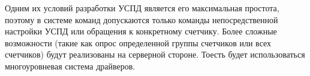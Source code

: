Одним их условий разработки УСПД является его максимальная простота, поэтому в системе команд допускаются только команды непосредственной настройки УСПД или обращения к конкретному счетчику. Более сложные возможности (такие как опрос определенной группы счетчиков или всех счетчиков) будут реализованы на серверной стороне. Тоесть будет использоваться многоуровневая система драйверов.

